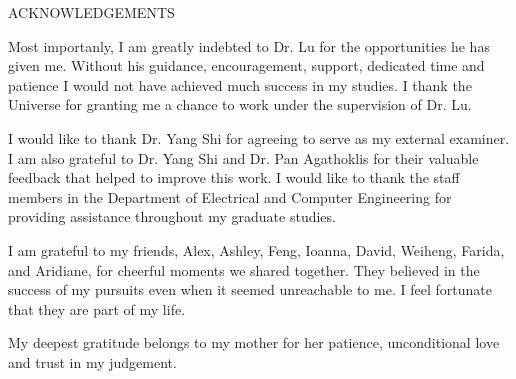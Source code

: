 \newpage
{}

\begin{center}
ACKNOWLEDGEMENTS
\end{center}

Most importanly, I am greatly indebted to Dr. Lu for the opportunities he has given me. Without his guidance, encouragement, support, dedicated time and patience I would not have achieved much success in my studies. I thank the Universe for granting me a chance to work under the supervision of Dr. Lu. 

I would like to thank Dr. Yang Shi for agreeing to serve as my external examiner.  I  am also grateful to Dr. Yang Shi and Dr. Pan Agathoklis for their valuable feedback that helped  to improve this work. I would like to thank the staff  members in the Department of Electrical and Computer Engineering for providing assistance throughout my graduate studies. 

I am grateful to my friends,  Alex, Ashley, Feng, Ioanna, David, Weiheng,  Farida, and Aridiane, 
 for cheerful moments we shared together. They believed in the success of my  pursuits even when it seemed unreachable to me. I feel fortunate that they are part of my life. 

My deepest gratitude belongs to my mother for her patience, unconditional love and trust in my judgement. %


%
%
